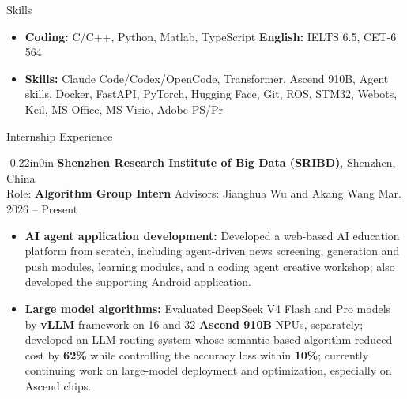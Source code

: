 \documentclass{resume} %
\begin{document}
\begin{rSection}{Skills}
	
	\begin{itemize}[left = -0.22in]
		\item \textbf{Coding:} C/C++, Python, Matlab, TypeScript 
		\quad \textbf{English:} IELTS 6.5, CET-6 564
		\item \textbf{Skills:} Claude Code/Codex/OpenCode, Transformer, Ascend 910B, Agent skills, Docker, FastAPI, PyTorch, Hugging Face, Git, ROS, STM32, Webots, Keil, MS Office, MS Visio, Adobe PS/Pr
	\end{itemize}
	
\end{rSection} 




\newpage
\begin{rSection}{Internship Experience}
	
\begin{adjustwidth}{-0.22in}{0in}
	\textbf{\href{https://www.sribd.cn/en}{Shenzhen Research Institute of Big Data (SRIBD)}}, Shenzhen, China  
	\\
	Role: \textbf{Algorithm Group Intern}
	\quad Advisors: Jianghua Wu and Akang Wang 
	\hfill Mar. 2026 -- Present
\end{adjustwidth}
\begin{itemize}[left = -0.22in]
	\item \textbf{AI agent application development:} Developed a web-based AI education platform from scratch, including agent-driven news screening, generation and push modules, learning modules, and a coding agent creative workshop; also developed the supporting Android application.
	
	\vspace{-0.5em}
	\item \textbf{Large model algorithms:} Evaluated DeepSeek V4 Flash and Pro models by \textbf{vLLM} framework on 16 and 32 \textbf{Ascend 910B} NPUs, separately; developed an LLM routing system whose semantic-based algorithm reduced cost by \textbf{62\%} while controlling the accuracy loss within \textbf{10\%}; currently continuing work on large-model deployment and optimization, especially on Ascend chips.
\end{itemize}

\end{rSection}
\end{document}
